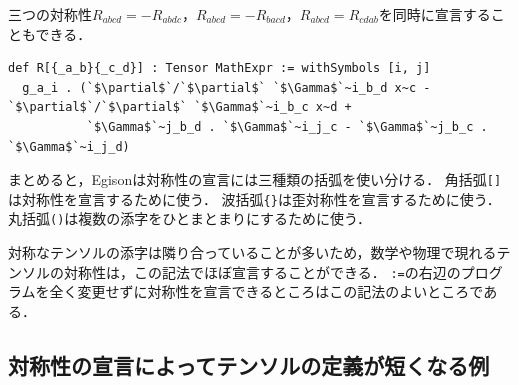 三つの対称性$R_{abcd} = -R_{abdc}$，$R_{abcd} = -R_{bacd}$，$R_{abcd} = R_{cdab}$を同時に宣言することもできる．
\begin{lstlisting}[language=egison,numbers=none]
def R[{_a_b}{_c_d}] : Tensor MathExpr := withSymbols [i, j]
  g_a_i . (`$\partial$`/`$\partial$` `$\Gamma$`~i_b_d x~c - `$\partial$`/`$\partial$` `$\Gamma$`~i_b_c x~d +
           `$\Gamma$`~j_b_d . `$\Gamma$`~i_j_c - `$\Gamma$`~j_b_c . `$\Gamma$`~i_j_d)
\end{lstlisting}

まとめると，Egisonは対称性の宣言には三種類の括弧を使い分ける．
角括弧\lstinline|[]|は対称性を宣言するために使う．
波括弧\lstinline|{}|は歪対称性を宣言するために使う．
丸括弧\lstinline|()|は複数の添字をひとまとまりにするために使う．

対称なテンソルの添字は隣り合っていることが多いため，数学や物理で現れるテンソルの対称性は，この記法でほぼ宣言することができる．
\lstinline{:=}の右辺のプログラムを全く変更せずに対称性を宣言できるところはこの記法のよいところである．


\subsection{対称性の宣言によってテンソルの定義が短くなる例}

